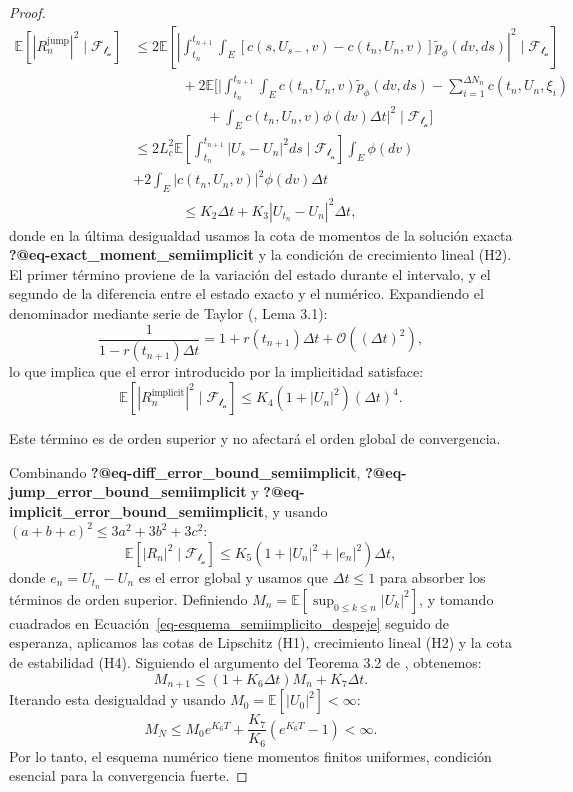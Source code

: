 \documentclass[
  spanish,
  us-letterpaper,
]{scrreprt}
\theoremstyle{plain}
\theoremstyle{plain}
\theoremstyle{definition}
\theoremstyle{remark}
\begin{document}
\begin{proof}
\[\begin{aligned}
\mathbb{E}\left[ |R_n^{\text{jump}}|^2 \mid \mathcal{F_{t_n}} \right] 
&\leq 2\mathbb{E}\left[ \left| \int_{t_n}^{t_{n+1}} \int_E [c(s, U_{s-}, v) - c(t_n, U_n, v)] \tilde{p}_\phi(dv, ds) \right|^2 \mid \mathcal{F_{t_n}} \right] \nonumber \\
&\quad \ \ \ \ \ \ \ \ \ \ \ + 2\mathbb{E}\Biggl[ \Biggl| \int_{t_n}^{t_{n+1}} \int_E c(t_n, U_n, v) \tilde{p}_\phi(dv, ds) - \sum_{i=1}^{\Delta N_n} c(t_n, U_n, \xi_i) \\
&\quad \ \ \ \ \ \ \ \ \ \ \  \ \ \ \ \ \ \ \ + \int_E c(t_n, U_n, v) \phi(dv)\Delta t \Biggl|^2 \mid \mathcal{F_{t_n}} \Biggr] \nonumber \\
&\leq 2L_c^2 \mathbb{E}\left[ \int_{t_n}^{t_{n+1}} |U_s - U_n|^2 ds \mid \mathcal{F_{t_n}} \right] \int_E \phi(dv) \\
& + 2 \int_E |c(t_n, U_n, v)|^2 \phi(dv) \Delta t \nonumber \\
& \quad \ \ \ \ \ \ \ \ \ \ \ \leq K_2 \Delta t + K_3 |U_{t_n} - U_n|^2 \Delta t,
\end{aligned}\] donde en la última desigualdad usamos la cota de
momentos de la solución exacta \textbf{?@eq-exact\_moment\_semiimplicit}
y la condición de crecimiento lineal (H2). El primer término proviene de
la variación del estado durante el intervalo, y el segundo de la
diferencia entre el estado exacto y el numérico. Expandiendo el
denominador mediante serie de Taylor (\textcite{wang2007}, Lema 3.1):
\[\frac{1}{1 - r(t_{n+1})\Delta t} = 1 + r(t_{n+1})\Delta t + \mathcal{O}((\Delta t)^2),\]
lo que implica que el error introducido por la implicitidad satisface:
\[\mathbb{E}\left[ |R_n^{\text{implicit}}|^2 \mid \mathcal{F_{t_n}} \right] \leq K_4 (1 + |U_n|^2) (\Delta t)^4.\]

Este término es de orden superior y no afectará el orden global de
convergencia.

Combinando \textbf{?@eq-diff\_error\_bound\_semiimplicit},
\textbf{?@eq-jump\_error\_bound\_semiimplicit} y
\textbf{?@eq-implicit\_error\_bound\_semiimplicit}, y usando
\((a+b+c)^2 \leq 3a^2 + 3b^2 + 3c^2\):
\[\mathbb{E}\left[ |R_n|^2 \mid \mathcal{F_{t_n}} \right] \leq K_5 (1 + |U_n|^2 + |e_n|^2) \Delta t,\]
donde \(e_n = U_{t_n} - U_n\) es el error global y usamos que
\(\Delta t \leq 1\) para absorber los términos de orden superior.
Definiendo
\(M_n = \mathbb{E}\left[ \sup_{0 \leq k \leq n} |U_k|^2 \right]\), y
tomando cuadrados en Ecuación~\ref{eq-esquema_semiimplicito_despeje}
seguido de esperanza, aplicamos las cotas de Lipschitz (H1), crecimiento
lineal (H2) y la cota de estabilidad (H4). Siguiendo el argumento del
Teorema 3.2 de \textcite{higham2005}, obtenemos:
\[M_{n+1} \leq (1 + K_6 \Delta t) M_n + K_7 \Delta t.\] Iterando esta
desigualdad y usando \(M_0 = \mathbb{E}[|U_0|^2] < \infty\):
\[M_N \leq M_0 e^{K_6 T} + \frac{K_7}{K_6} (e^{K_6 T} - 1) < \infty.\]
Por lo tanto, el esquema numérico tiene momentos finitos uniformes,
condición esencial para la convergencia fuerte.


\end{proof}
\end{document}
